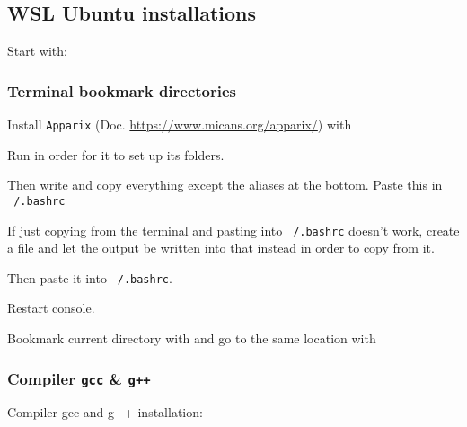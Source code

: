 \subsection{WSL Ubuntu installations} \label{sec:wsl_ubuntu_installations}

Start with:


\subsubsection{Terminal bookmark directories}
Install \texttt{Apparix} (Doc. \url{https://www.micans.org/apparix/}) with\\

Run  in order for it to set up its folders.

Then write  and copy everything except the aliases at the bottom. Paste this in \texttt{~/.bashrc}

If just copying from the terminal and pasting into \texttt{~/.bashrc} doesn't work, create a file and let the output be written into that instead in order to copy from it.



Then paste it into \texttt{~/.bashrc}.

Restart console.

Bookmark current directory with  and go to the same location with 

\subsubsection{Compiler \texttt{gcc} \& \texttt{g++}}
Compiler gcc and g++ installation:


